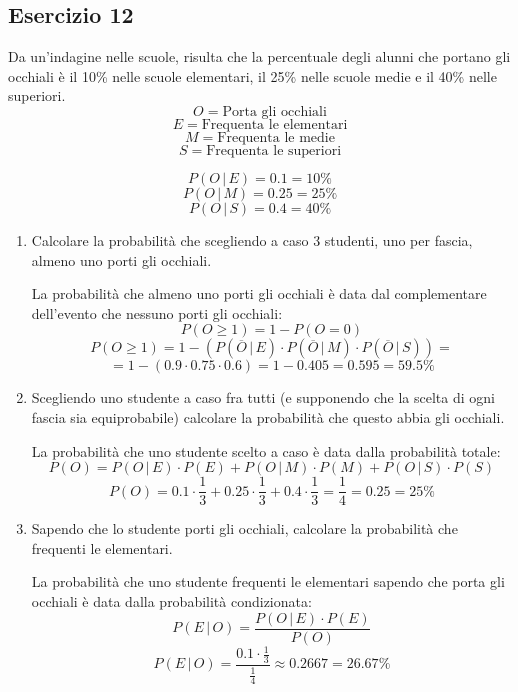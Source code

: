 \documentclass[a4paper]{article}
\theoremstyle{break}
\theoremstyle{break}
\theoremstyle{break}
\theoremstyle{break}
\begin{document}
\subsection{Esercizio 12}
Da un'indagine nelle scuole, risulta che la percentuale degli alunni che portano gli
occhiali è il 10\% nelle scuole elementari, il 25\% nelle scuole medie e il 40\% nelle
superiori.
\[
	O = \text{Porta gli occhiali}
\]
\[
	E = \text{Frequenta le elementari}
\]
\[
	M = \text{Frequenta le medie}
\]
\[
	S = \text{Frequenta le superiori}
\]

\[
	P(O\,|\,E) = 0.1 = 10\%
\]
\[
	P(O\,|\,M) = 0.25 = 25\%
\]
\[
	P(O\,|\,S) = 0.4 = 40\%
\]
\begin{enumerate}
	\item Calcolare la probabilità che scegliendo a caso 3 studenti, uno per fascia, almeno
	      uno porti gli occhiali.

	      \vspace{1em}
	      La probabilità che almeno uno porti gli occhiali è data dal complementare dell'evento
	      che nessuno porti gli occhiali:
	      \[
		      P(O \ge 1) = 1 - P(O = 0)
	      \]
	      \[
		      P(O \ge 1) = 1 - \left( P(\overline{O}\,|\,E) \cdot P(\overline{O}\,|\,M) \cdot P(\overline{O}\,|\,S) \right) =
	      \]
	      \[
		      = 1 - \left( 0.9 \cdot 0.75 \cdot 0.6 \right) = 1 - 0.405 = 0.595 = 59.5\%
	      \]
	\item Scegliendo uno studente a caso fra tutti (e supponendo che la scelta di ogni
	      fascia sia equiprobabile) calcolare la probabilità che questo abbia gli occhiali.

	      \vspace{1em}
	      La probabilità che uno studente scelto a caso è data dalla probabilità totale:
	      \[
		      P(O) = P(O\,|\,E) \cdot P(E) + P(O\,|\,M) \cdot P(M) + P(O\,|\,S) \cdot P(S)
	      \]
	      \[
		      P(O) = 0.1 \cdot \frac{1}{3} + 0.25 \cdot \frac{1}{3} + 0.4 \cdot \frac{1}{3} = \frac{1}{4} = 0.25 = 25\%
	      \]
	\item Sapendo che lo studente porti gli occhiali, calcolare la probabilità che
	      frequenti le elementari.

	      \vspace{1em}
	      \noindent La probabilità che uno studente frequenti le elementari sapendo che porta
	      gli occhiali è data dalla probabilità condizionata:
	      \[
		      P(E\,|\,O) = \frac{P(O\,|\,E) \cdot P(E)}{P(O)}
	      \]
	      \[
		      P(E\,|\,O) = \frac{0.1 \cdot \frac{1}{3}}{\frac{1}{4}} \approx 0.2667 = 26.67\%
	      \]
\end{enumerate}
\end{document}
